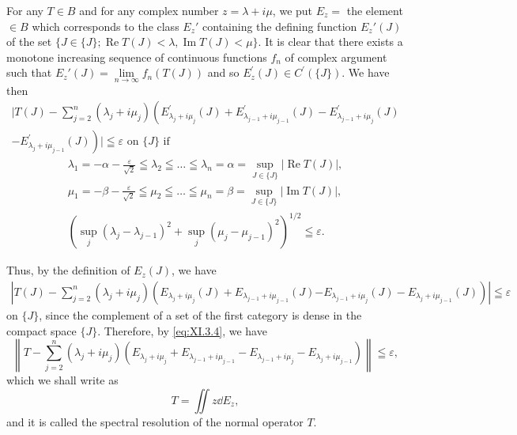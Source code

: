 For any $T \in B$ and for any complex number $z = \lambda + i\mu$, we put $E_z =$ the element $\in B$ which corresponds to the class $E_z'$ containing the defining function $E_z'(J)$ of the set $\{J \in \{J\}; \operatorname{Re} T(J) < \lambda, \operatorname{Im} T(J) < \mu\}$. It is clear that there exists a monotone increasing sequence of continuous functions $f_n$ of complex argument such that $E_z'(J) = \lim\limits_{n \to \infty} f_n(T(J))$ and 
so $E_{z}^{\prime}(J)\in C^{\prime}(\{J\})$. We have then 
\[
\begin{gathered}
| T (J) - \sum\limits_{j=2} ^{n} (\lambda_{j} + i \mu_{j}) \left(E _ {\lambda_{j} + i \mu_{j}} ^{\prime} (J) + E _ {\lambda_{j-1} + i \mu_{j-1}} ^{\prime} (J) - E _ {\lambda_{j-1} + i \mu_{j}} ^{\prime} (J) \right.
\\
\left. - E _ {\lambda_{j} + i \mu_{j-1}} ^{\prime} (J)\right) | \leqq \varepsilon \text{ on } \{J \} \text{ if }
\end{gathered}
\]
\[
\begin{gathered}
\lambda_{1} = - \alpha - \frac {\varepsilon}{\sqrt {2}} \leqq \lambda_{2} \leqq \dots \leqq \lambda_{n} = \alpha = \sup\limits _ {J \in \{J \}} | \operatorname{Re} T (J) |,
\\
\mu_{1} = - \beta - \frac {\varepsilon}{\sqrt {2}} \leqq \mu_{2} \leqq \dots \leqq \mu_{n} = \beta = \sup\limits _ {J \in \{J \}} | \operatorname{Im} T (J) |,
\\
\left(\sup\limits _{j} (\lambda_{j} - \lambda_{j-1}) ^{2} + \sup\limits _{j} (\mu_{j} - \mu_{j-1}) ^{2}\right) ^{1/2} \leqq \varepsilon .
\end{gathered}
\]

Thus, by the definition of $E_{z}(J)$, we have 
\[
\begin{gathered}
\left| T (J) - \sum\limits_{j=2} ^{n} (\lambda_{j} + i \mu_{j}) \left(E _ {\lambda_{j} + i \mu_{j}} (J) + E _ {\lambda_{j-1} + i \mu_{j-1}} (J) \right. \right. \left. \left. - E _ {\lambda_{j-1} + i \mu_{j}} (J) - E _ {\lambda_{j} + i \mu_{j-1}} (J)\right) \right| \leqq \varepsilon
\end{gathered}
\]
on $\{J\}$, since the complement of a set of the first category is dense in the compact space $\{J\}$. Therefore, by \eqref{eq:XI.3.4}, we have 
\[
\left\| T - \sum\limits_{j=2} ^{n} \left(\lambda_{j} + i \mu_{j}\right) \left(E _ {\lambda_{j} + i \mu_{j}} + E _ {\lambda_{j-1} + i \mu_{j-1}} - E _ {\lambda_{j-1} + i \mu_{j}} - E _ {\lambda_{j} + i \mu_{j-1}}\right) \right\| \leqq \varepsilon ,
\]
which we shall write as 
\begin{equation}\label{eq:XI.3.12}
T = \iint z \dd E _{z},
\end{equation}
and it is called the spectral resolution of the normal operator $T$. 


